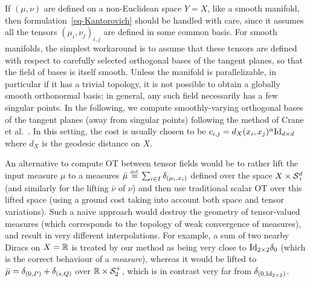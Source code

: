 \begin{rem}
	If $(\mu,\nu)$ are defined on a non-Euclidean space $Y=X$, like a smooth manifold, then formulation~\eqref{eq-Kantorovich} should be handled with care, since it assumes all the tensors $(\mu_i,\nu_j)_{i,j}$ are defined %
	in some common basis. 
	For smooth manifolds, the simplest workaround is to assume that these tensors are defined with respect to carefully selected orthogonal bases of the tangent planes, so that the field of bases is itself smooth. Unless the manifold is parallelizable, in particular if it has a trivial topology, it is not possible to obtain a globally smooth orthonormal basis; in general, any such field necessarily has a few singular points. In the following, we compute smoothly-varying orthogonal bases of the tangent planes (away from singular points) following the method of Crane et al.~. 
	In this setting, the cost is usually chosen to be $c_{i,j} = d_X(x_i,x_j)^\alpha \mathrm{Id}_{d \times d}$ where $d_X$ is the geodesic distance on $X$. 
\end{rem}

\begin{rem}
An alternative to compute OT between tensor fields would be to rather lift the input measure $\mu$ to a measures $\bar \mu \eqdef \sum_{i \in I}  \de_{(\mu_i,x_i)}$ defined over the space $X \times \mathcal{S}_+^d$ (and similarly for the lifting $\bar\nu$ of $\nu$) and then use traditional scalar OT over this lifted space (using a ground cost taking into account both space and tensor variations). 
%
Such a naive approach would destroy the geometry of tensor-valued measures (which corresponds to the topology of weak convergence of measures), and result in very different interpolations. For example, a sum of two nearby Diracs on $X=\mathbb{R}$  
is treated by our method as being very close to $\mathrm{Id}_{2\times 2} \delta_{0}$ (which is the correct behaviour of a \emph{measure}), whereas it would be lifted to 
$\bar\mu=\delta_{(0,P)}+\delta_{(s,Q)}$ over $\mathbb{R} \times \mathcal{S}_2^+$, which is in contrast very far from $\delta_{(0,\mathrm{Id}_{2\times 2})}$.
\end{rem}


